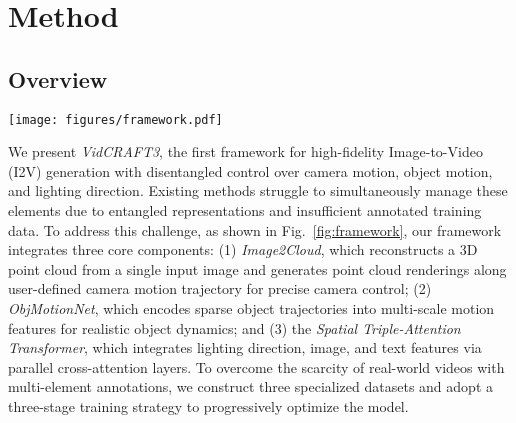 \section{Method}
\label{sec:method}

\subsection{Overview}

\begin{figure*}[t]
    \centering
    \texttt{[image: figures/framework.pdf]}
    \caption{Architecture of \textbf{VidCRAFT3} for controlled image-to-video generation. The model builds on Video Diffusion Model (VDM) and consists of three main components: the \textit{Image2Cloud} reconstructs 3D point cloud from a single reference image and generates point cloud renderings along user-defined camera motion trajectory; the \textit{ObjMotionNet} injects object dynamics into the UNet by encoding sparse trajectories into multi-scale motion features; the \textit{Spatial Triple-Attention Transformer} integrates image, text, and lighting information via parallel cross-attention modules. The model enables I2V generation conditioned on arbitrary combination of camera motion, object motion, and lighting direction.
    }
    \label{fig:framework}
    \vspace{-5pt}
\end{figure*}

We present \textit{VidCRAFT3}, the first framework for high-fidelity Image-to-Video (I2V) generation with disentangled control over camera motion, object motion, and lighting direction. Existing methods struggle to simultaneously manage these elements due to entangled representations and insufficient annotated training data.
To address this challenge, as shown in Fig.~\ref{fig:framework}, our framework integrates three core components: (1) \textit{Image2Cloud}, which reconstructs a 3D point cloud from a single input image and generates point cloud renderings along user-defined camera motion trajectory for precise camera control; (2) \textit{ObjMotionNet}, which encodes sparse object trajectories into multi-scale motion features for realistic object dynamics; and (3) the \textit{Spatial Triple-Attention Transformer}, which integrates lighting direction, image, and text features via parallel cross-attention layers.
To overcome the scarcity of real-world videos with multi-element annotations, we construct three specialized datasets and adopt a three-stage training strategy to progressively optimize the model.

